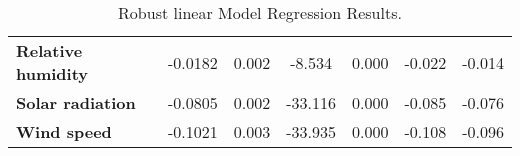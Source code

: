 \begin{landscape}
\begin{table}
\begin{center}
\begin{tabular}{lcccccc}
\textbf{Relative humidity}                                  &      -0.0182  &        0.002     &    -8.534  &         0.000        &       -0.022    &       -0.014     \\
\textbf{Solar radiation}                                    &      -0.0805  &        0.002     &   -33.116  &         0.000        &       -0.085    &       -0.076     \\
\textbf{Wind speed}                                         &      -0.1021  &        0.003     &   -33.935  &         0.000        &       -0.108    &       -0.096     \\
\bottomrule
\end{tabular}
\caption{Robust linear Model Regression Results.}
\label{tab:Robust_table}
\end{center}
\end{table}
\end{landscape}
